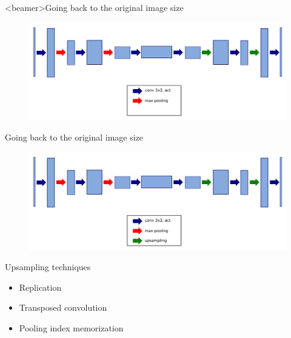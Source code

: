 \documentclass[xcolor=pdftex,dvipsnames,table,mathserif]{beamer}
\begin{document}
\begin{frame}<beamer>{Going back to the original image size}

    \begin{figure}
      \includegraphics[width=\textwidth]{going_back2.png}
    \end{figure}

\end{frame}


\begin{frame}{Going back to the original image size}

    \begin{figure}
      \includegraphics[width=\textwidth]{going_back.png}
    \end{figure}

\end{frame}


\begin{frame}{Upsampling techniques}


\begin{itemize}
\item Replication
\item Transposed convolution
\item Pooling index memorization
\end{itemize}

\end{frame}
\end{document}
